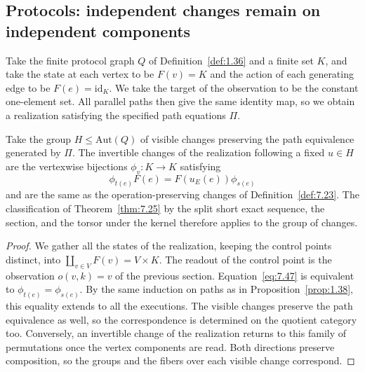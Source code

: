 \subsection*{Protocols: independent changes remain on independent components}

\begin{proposition}\label{prop:7.29}

Take the finite protocol graph $Q$ of Definition~\ref{def:1.36} and a finite set $K$, and
take the state at each vertex to be $F(v)=K$ and the action of each generating edge to be
$F(e)=\mathrm{id}_K$.
We take the target of the observation to be the constant one-element set. All parallel paths
then give the same identity map, so we obtain a realization satisfying the specified path
equations $\Pi$.

Take the group $H\le\mathrm{Aut}(Q)$ of visible changes preserving the path equivalence
generated by $\Pi$.
The invertible changes of the realization following a fixed $u\in H$ are the vertexwise
bijections $\phi_v:K\to K$ satisfying
\begin{equation*}
\phi_{t(e)}F(e)=F(u_E(e))\phi_{s(e)}
\tag{7.47}\label{eq:7.47}
\end{equation*}
and are the same as the operation-preserving changes of Definition~\ref{def:7.23}.
The classification of Theorem~\ref{thm:7.25} by the split short exact sequence, the section,
and the torsor under the kernel therefore applies to the group of changes.

\end{proposition}

\begin{proof}

We gather all the states of the realization, keeping the control points distinct, into
$\coprod_{v\in V}F(v)=V\times K$.
The readout of the control point is the observation $o(v,k)=v$ of the previous section.
Equation~\eqref{eq:7.47} is equivalent to $\phi_{t(e)}=\phi_{s(e)}$.
By the same induction on paths as in Proposition~\ref{prop:1.38}, this equality extends to
all the executions.
The visible changes preserve the path equivalence as well, so the correspondence is
determined on the quotient category too.
Conversely, an invertible change of the realization returns to this family of permutations
once the vertex components are read.
Both directions preserve composition, so the groups and the fibers over each visible change
correspond.

\end{proof}

